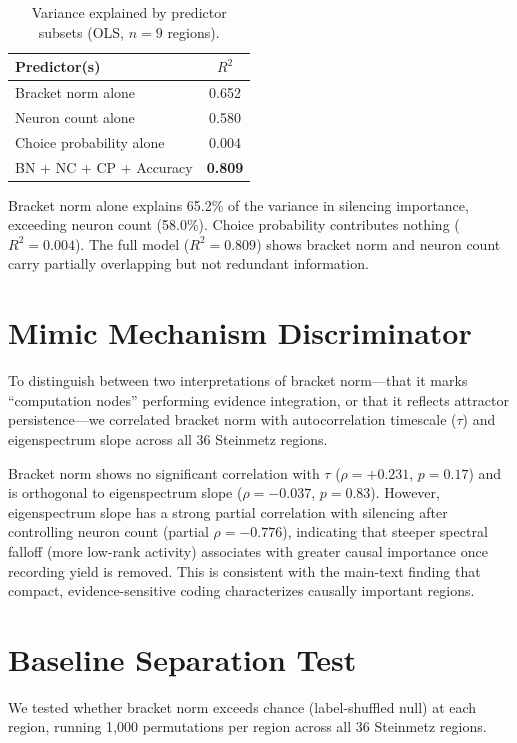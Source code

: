 \documentclass[9pt,lineno]{elife}
\begin{document}
\begin{table}[h]
\centering
\caption{Variance explained by predictor subsets (OLS, $n = 9$ regions).}
\label{tab:joint}
\begin{tabular}{lc}
\toprule
Predictor(s) & $R^2$ \\
\midrule
Bracket norm alone & 0.652 \\
Neuron count alone & 0.580 \\
Choice probability alone & 0.004 \\
BN + NC + CP + Accuracy & \textbf{0.809} \\
\bottomrule
\end{tabular}
\end{table}

Bracket norm alone explains 65.2\% of the variance in silencing importance, exceeding neuron count (58.0\%). Choice probability contributes nothing ($R^2 = 0.004$). The full model ($R^2 = 0.809$) shows bracket norm and neuron count carry partially overlapping but not redundant information.

\section{Mimic Mechanism Discriminator}
\label{app:mimic}

To distinguish between two interpretations of bracket norm---that it marks ``computation nodes'' performing evidence integration, or that it reflects attractor persistence---we correlated bracket norm with autocorrelation timescale ($\tau$) and eigenspectrum slope across all 36 Steinmetz regions.

Bracket norm shows no significant correlation with $\tau$ ($\rho = +0.231$, $p = 0.17$) and is orthogonal to eigenspectrum slope ($\rho = -0.037$, $p = 0.83$). However, eigenspectrum slope has a strong partial correlation with silencing after controlling neuron count (partial $\rho = -0.776$), indicating that steeper spectral falloff (more low-rank activity) associates with greater causal importance once recording yield is removed. This is consistent with the main-text finding that compact, evidence-sensitive coding characterizes causally important regions.

\section{Baseline Separation Test}
\label{app:baseline}

We tested whether bracket norm exceeds chance (label-shuffled null) at each region, running 1{,}000 permutations per region across all 36 Steinmetz regions.
\end{document}
